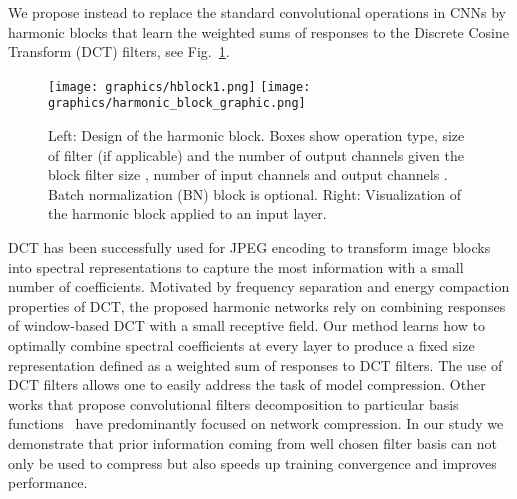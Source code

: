 \documentclass[12pt,a4paper]{article}
\begin{document}
We propose instead to replace the standard convolutional operations in CNNs by harmonic blocks that learn the weighted sums of responses to the Discrete Cosine Transform (DCT) filters, see Fig.~\ref{fig:harmlayer}.
\begin{figure}[!h]
\begin{center}
\begin{center}
   \texttt{[image: graphics/hblock1.png]}
   \texttt{[image: graphics/harmonic\_block\_graphic.png]}
\end{center}
\end{center}
\vspace{-.5\baselineskip}
\caption{Left: Design of the harmonic block. 
Boxes show operation type, size of filter (if applicable) and the number of output channels given the block filter size , number of input channels  and output channels . Batch normalization (BN) block is optional. Right: Visualization of the harmonic block applied to an input layer.}
\label{fig:harmlayer}
\end{figure}
DCT has been successfully used for JPEG encoding to transform image blocks into spectral representations to capture the most information with a small number of coefficients.
Motivated by frequency separation and energy compaction properties of DCT, the proposed harmonic networks rely on combining responses of window-based DCT with a small receptive field.
Our method learns how to optimally combine spectral coefficients at every layer to produce a fixed size representation defined as a weighted sum of responses to DCT filters. The use of DCT filters allows one to easily address the task of model compression. 
Other works that propose convolutional filters decomposition to particular basis functions~\cite{Qiu18,Tayyab19} have predominantly focused on network compression. In our study we demonstrate that prior information coming from well chosen filter basis can not only be used to compress but also speeds up training convergence and improves performance.
\end{document}
